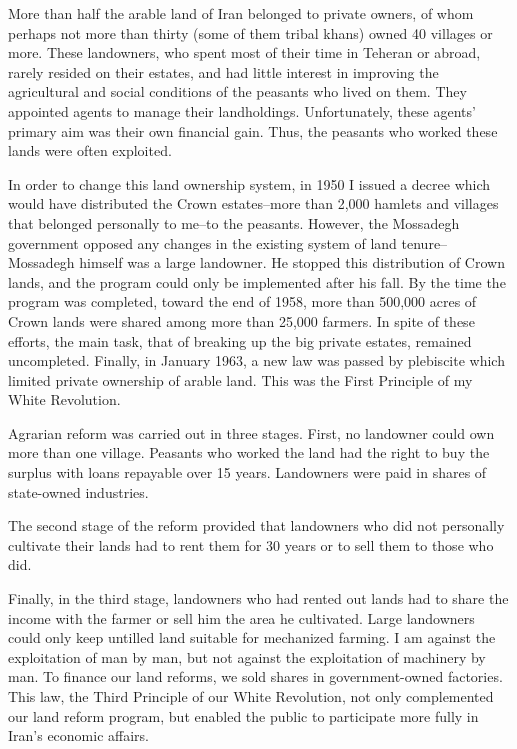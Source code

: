 More than half the arable land of Iran belonged to private owners, of whom perhaps not more than thirty (some of them tribal khans) owned 40 villages or more. These landowners, who spent most of their time in Teheran or abroad, rarely resided on their estates, and had little interest in improving the agricultural and social conditions of the peasants who lived on them. They appointed agents to manage their landholdings. Unfortunately, these agents’ primary aim was their own financial gain. Thus, the peasants who worked these lands were often exploited. 

In order to change this land ownership system, in 1950 I issued a decree which would have distributed the Crown estates--more than 2,000 hamlets and villages that belonged personally to me--to the peasants. However, the Mossadegh government opposed any changes in the existing system of land tenure--Mossadegh himself was a large landowner. He stopped this distribution of Crown lands, and the program could only be implemented after his fall. By the time the program was completed, toward the end of 1958, more than 500,000 acres of Crown lands were shared among more than 25,000 farmers. In spite of these efforts, the main task, that of breaking up the big private estates, remained uncompleted. Finally, in January 1963, a new law was passed by plebiscite which limited private ownership of arable land. This was the First Principle of my White Revolution. 


Agrarian reform was carried out in three stages. First, no landowner could own more than one village. Peasants who worked the land had the right to buy the surplus with loans repayable over 15 years. Landowners were paid in shares of state-owned industries. 

The second stage of the reform provided that landowners who did not personally cultivate their lands had to rent them for 30 years or to sell them to those who did. 

Finally, in the third stage, landowners who had rented out lands had to share the income with the farmer or sell him the area he cultivated. Large landowners could only keep untilled land suitable for mechanized farming. I am against the exploitation of man by man, but not against the exploitation of machinery by man. To finance our land reforms, we sold shares in government-owned factories. This law, the Third Principle of our White Revolution, not only complemented our land reform program, but enabled the public to participate more fully in Iran's economic affairs. 

